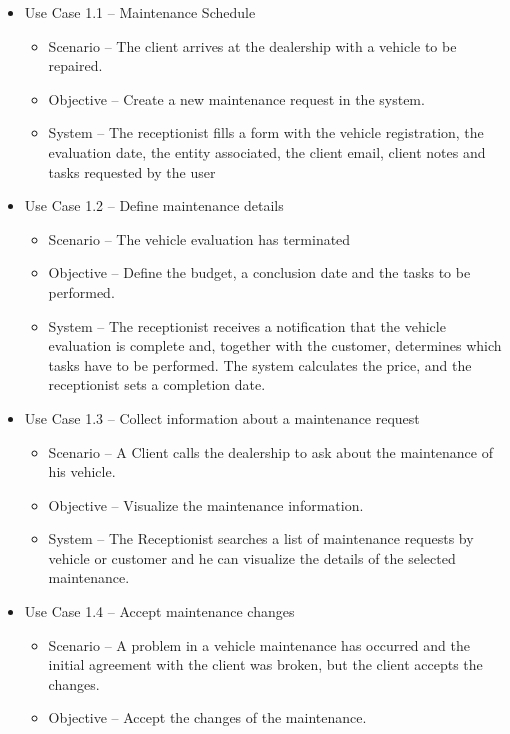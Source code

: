 \begin{itemize}
    \item Use Case 1.1 – Maintenance Schedule
    \begin{itemize}
      \item Scenario – The client arrives at the dealership with a vehicle to be repaired.
      \item Objective – Create a new maintenance request in the system.
      \item System – The receptionist fills a form with the vehicle registration, the evaluation date, the entity associated, the client email, client notes and tasks requested by the user
    \end{itemize}
        \item Use Case 1.2 – Define maintenance details
    \begin{itemize}
      \item Scenario – The vehicle evaluation has terminated
      \item Objective – Define the budget, a conclusion date and the tasks to be performed.
      \item System – The receptionist receives a notification that the vehicle evaluation is complete and, together with the customer, determines which tasks have to be performed. The system calculates the price, and the receptionist sets a completion date.
    \end{itemize}
    \item Use Case 1.3 – Collect information about a maintenance request
    \begin{itemize}
      \item Scenario – A Client calls the dealership to ask about the maintenance of his vehicle.
      \item Objective – Visualize the maintenance information.
      \item System –  The Receptionist searches a list of maintenance requests by vehicle or customer and he can visualize the details of the selected maintenance.
    \end{itemize}
    \item Use Case 1.4 – Accept maintenance changes
    \begin{itemize}
      \item Scenario – A problem in a vehicle maintenance has occurred and the initial agreement with the client was broken, but the client accepts the changes.
      \item Objective – Accept the changes of the maintenance.

\end{itemize}
\end{itemize}
